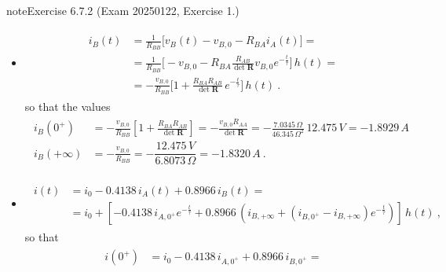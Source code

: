 \documentclass[letterpaper,10pt,english]{jupyterBook}
\begin{document}
\begin{sphinxadmonition}{note}{Exercise 6.7.2 (Exam 2025\sphinxhyphen{}01\sphinxhyphen{}22, Exercise 1.)}
\begin{itemize}
\item {} 
\sphinxAtStartPar
{}
\begin{equation*}
\begin{split}\begin{aligned}
     i_B(t) 
     & = \frac{1}{R_{BB}} \bigg[ v_B(t) - v_{B,0} - R_{BA} i_A(t) \bigg] = \\
     & = \frac{1}{R_{BB}} \bigg[ - v_{B,0} - R_{BA} \frac{R_{AB}}{\det \mathbf{R}} v_{B,0} e^{-\frac{t}{\tau}} \bigg] \, h(t) = \\
     & = - \frac{v_{B,0}}{R_{BB}} \bigg[ 1 + \frac{R_{BA} R_{AB}}{\det \mathbf{R}} \, e^{-\frac{t}{\tau}} \bigg] \, h(t) \ .
   \end{aligned}\end{split}
\end{equation*}
\sphinxAtStartPar
so that the values
\begin{equation*}
\begin{split}\begin{aligned}
     i_B(0^+)     & = -\frac{v_{B,0}}{R_{BB}} \left[ 1 + \frac{R_{BA} R_{AB}}{\det \mathbf{R}} \right] = -\frac{v_{B,0} R_{AA}}{\det \mathbf{R}} =  - \frac{7.0345 \, \Omega}{46.345 \, \Omega^2} \, 12.475 \, V = - 1.8929 \, A \\
     i_B(+\infty) & = -\frac{v_{B,0}}{R_{BB}} = - \dfrac{12.475 \, V}{6.8073 \, \Omega} = -1.8320 \, A \ .
   \end{aligned}\end{split}
\end{equation*}
\item {} 
\sphinxAtStartPar
{}
\begin{equation*}
\begin{split}\begin{aligned}
     i(t)
     & = i_{0} - 0.4138 \, i_A(t) + 0.8966 \, i_B(t) = \\
     & = i_{0} + \left[ - 0.4138 \, i_{A,0^+} e^{-\frac{t}{\tau}}  + 0.8966 \, \left( i_{B,+\infty} + (i_{B,0^+} - i_{B,+\infty}) e^{-\frac{t}{\tau}} \right) \right] \, h(t) \ ,
   \end{aligned}\end{split}
\end{equation*}
\sphinxAtStartPar
so that
\begin{equation*}
\begin{split}\begin{aligned}
     i(0^+)     & = i_{0} - 0.4138 \, i_{A,0^+} + 0.8966 \, i_{B,0^+} = \\

\end{aligned}
\end{split}
\end{equation*}
\end{itemize}
\end{sphinxadmonition}
\end{document}
